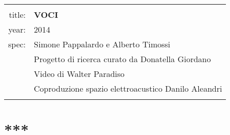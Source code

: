 \documentclass[8pt, twoside, a5paper]{extreport}
\begin{document}
\begin{Parallel}[c]{0.47\textwidth}{0.47\textwidth}
\noindent
\begin{tabular}{r|p{10cm}}
								&			\\
\textsf{title:}					&			\textbf{VOCI}						\\
\textsf{year:}					&			2014								\\
\textsf{spec:}					&			Simone Pappalardo e Alberto Timossi 				\\
								&			Progetto di ricerca curato da Donatella Giordano  \\
								&			Video di Walter Paradiso\\
								&			Coproduzione spazio elettroacustico Danilo Aleandri\\
								&			\\ %
\hline
\hline


\end{tabular}

\bigskip



	\ParallelPar
	
\section*{***}
	

\end{Parallel}
\end{document}
